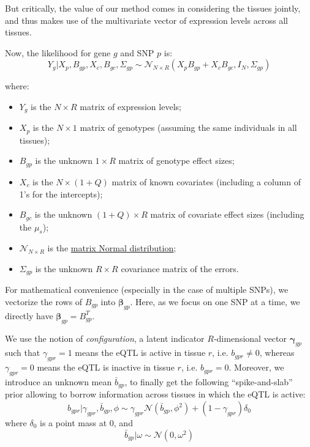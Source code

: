 \documentclass[10pt]{article}
\newcommand{\Norm}{{\mathcal{N}}} %
\begin{document}
But critically, the value of our method comes in considering the tissues jointly, and thus makes use of the multivariate vector of expression levels across all tissues.

Now, the likelihood for gene $g$ and SNP $p$ is:
\begin{equation}
Y_g | X_p, B_{gp}, X_c, B_{gc}, \Sigma_{gp} \sim \Norm_{N \times R}(X_p B_{gp} + X_c B_{gc}, I_N, \Sigma_{gp})
\end{equation}

where:
\begin{itemize}
\item $Y_g$ is the $N \times R$ matrix of expression levels;
\item $X_p$ is the $N \times 1$ matrix of genotypes (assuming the same individuals in all tissues);
\item $B_{gp}$ is the unknown $1 \times R$ matrix of genotype effect sizes;
\item $X_c$ is the $N \times (1+Q)$ matrix of known covariates (including a column of 1's for the intercepts);
\item $B_{gc}$ is the unknown $(1+Q) \times R$ matrix of covariate effect sizes (including the $\mu_s$);
\item $\Norm_{N \times R}$ is the \href{https://en.wikipedia.org/wiki/Matrix_normal_distribution}{matrix Normal distribution};
\item $\Sigma_{gp}$ is the unknown $R \times R$ covariance matrix of the errors.
\end{itemize}


For mathematical convenience (especially in the case of multiple SNPs), we vectorize the rows of $B_{gp}$ into $\bm{\beta}_{gp}$.
Here, as we focus on one SNP at a time, we directly have $\bm{\beta}_{gp} = B_{gp}^T$.

We use the notion of \emph{configuration}, a latent indicator $R$-dimensional vector $\bm{\gamma}_{gp}$ such that $\gamma_{gpr} = 1$ means the eQTL is active in tissue $r$, i.e. $b_{gpr} \ne 0$, whereas $\gamma_{gpr} = 0$ means the eQTL is inactive in tissue $r$, i.e. $b_{gpr} = 0$.
Moreover, we introduce an unknown mean $\bar{b}_{gp}$, to finally get the following ``spike-and-slab'' prior allowing to borrow information across tissues in which the eQTL is active:
\begin{equation}
  b_{gpr} | \gamma_{gpr}, \bar{b}_{gp}, \phi \sim \gamma_{gpr} \Norm(\bar{b}_{gp}, \phi^2) + (1 - \gamma_{gpr}) \delta_0
\end{equation}
where $\delta_0$ is a point mass at 0, and
\begin{equation}
  \bar{b}_{gp} | \omega \sim \Norm(0, \omega^2)
\end{equation}
\end{document}
